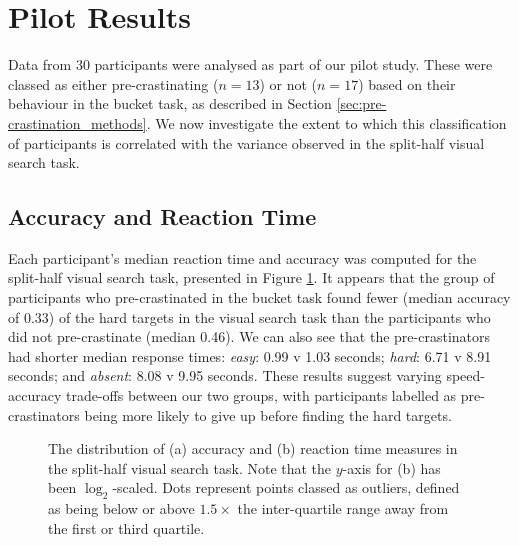 \documentclass[]{rsos}
\begin{document}
\section{Pilot Results}

Data from 30 participants were analysed as part of our pilot study. These were classed as either pre-crastinating ($n=13$) or not ($n=17$) based on their behaviour in the bucket task, as described in Section \ref{sec:pre-crastination_methods}. We now investigate the extent to which this classification of participants is correlated with the variance observed in the split-half visual search task.

\subsection{Accuracy and Reaction Time}
Each participant's median reaction time and accuracy was computed for the split-half visual search task, presented in Figure \ref{fig:exp1_summary}. It appears that the group of participants who pre-crastinated in the bucket task found fewer (median accuracy of 0.33) of the hard targets in the visual search task than the participants who did not pre-crastinate (median 0.46). We can also see that the pre-crastinators had shorter median response times: \textit{easy}: 0.99 v 1.03 seconds; \textit{hard}: 6.71 v 8.91 seconds; and \textit{absent}: 8.08 v 9.95 seconds. These results suggest varying speed-accuracy trade-offs between our two groups, with participants labelled as pre-crastinators being more likely to give up before finding the hard targets. 

\begin{figure}[t]
  \centering  
  \caption{The distribution of (a) accuracy and (b) reaction time measures in the split-half visual search task. Note that the $y$-axis for (b) has been $\log_2$-scaled. Dots represent points classed as outliers, defined as being below or above $1.5 \times$ the inter-quartile range away from the first or third quartile.}
  \label{fig:exp1_summary}
\end{figure}
\end{document}
